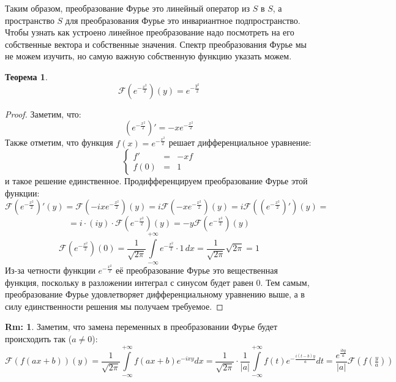 \documentclass[12pt]{article}
\theoremstyle{definition}
\newtheorem{rem}{Rm:}
\newtheorem{theorem}{Теорема}
\newcommand{\ddint}[2]{\displaystyle\int\limits_{#1}^{#2}}
\newcommand{\fourt}[1]{\mathcal{F}\left(#1\right)}
\begin{document}
Таким образом, преобразование Фурье это линейный оператор из $S$ в $S$, а пространство $S$ для преобразования Фурье это инвариантное подпространство. Чтобы узнать как устроено линейное преобразование надо посмотреть на его собственные вектора и собственные значения. Спектр преобразования Фурье мы не можем изучить, но самую важную собственную функцию указать можем.

\begin{theorem}
	$$
		\fourt{e^{-\frac{x^2}{2}}}(y) = e^{-\frac{y^2}{2}}
	$$
\end{theorem}
\begin{proof}
	Заметим, что:
	$$
		\left(e^{-\frac{x^2}{2}}\right)' = -xe^{-\frac{x^2}{2}}
	$$
	Также отметим, что функция $f(x) = e^{-\frac{x^2}{2}}$ решает дифференциальное уравнение: 
	$$
		\left\{
		\begin{array}{ccc}
			f' &=& -xf \\ 
			f(0) &=& 1
		\end{array}
		\right.
	$$
	и такое решение единственное. Продифференцируем преобразование Фурье этой функции:
	$$
		\fourt{e^{-\frac{x^2}{2}}}'(y) = \fourt{-ixe^{-\frac{x^2}{2}}}(y) = i\fourt{-xe^{-\frac{x^2}{2}}}(y) = i\fourt{\left(e^{-\frac{x^2}{2}}\right)' }(y) =
	$$
	$$
		=	i{\cdot}(iy){\cdot}\fourt{e^{-\frac{x^2}{2}}}(y) = -y\fourt{e^{-\frac{x^2}{2}}}(y)
	$$
	$$
			\fourt{e^{-\frac{x^2}{2}}}(0) = \dfrac{1}{\sqrt{2\pi}}\ddint{-\infty}{+\infty}e^{-\frac{x^2}{2}}{\cdot}1 \, dx = \dfrac{1}{\sqrt{2\pi}}\sqrt{2\pi} = 1 
	$$
	Из-за четности функции $e^{-\frac{x^2}{2}}$ её преобразование Фурье это вещественная  функция, поскольку в разложении интеграл с синусом будет равен $0$. Тем самым, преобразование Фурье удовлетворяет дифференциальному уравнению выше, а в силу единственности решения мы получаем требуемое.
\end{proof}
\begin{rem}
	Заметим, что замена переменных в преобразовании Фурье будет происходить так ($a \neq 0$):
	$$
		\fourt{f(ax + b)}(y) = \dfrac{1}{\sqrt{2\pi}}\ddint{-\infty}{+\infty}f(ax + b)e^{-ixy}dx = \dfrac{1}{\sqrt{2\pi}}{\cdot}\dfrac{1}{|a|}\ddint{-\infty}{+\infty}f(t)e^{-\frac{i(t-b)y}{a}}dt = \dfrac{e^{\tfrac{iby}{a}}}{|a|}\fourt{f\left(\tfrac{y}{a}\right)}
	$$
\end{rem}
\end{document}
